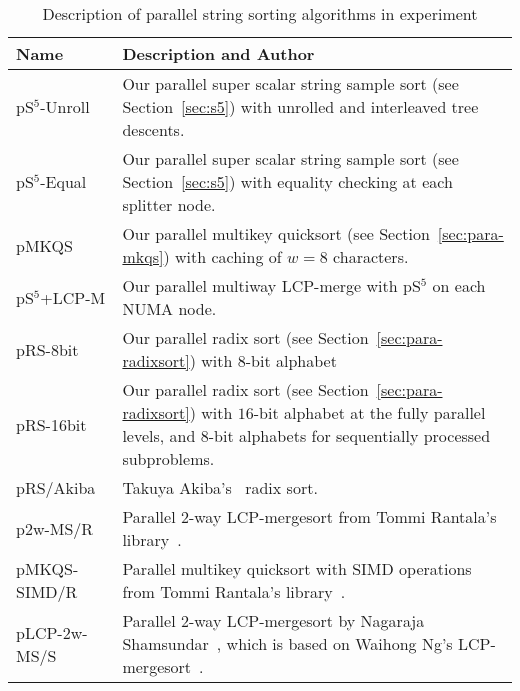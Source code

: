 \documentclass[a4paper]{myjournal}
\begin{document}
\begin{table}\centering\small
\caption{Description of parallel string sorting algorithms in experiment}\label{tab:paraalgo}
\begin{tabularx}{\linewidth}{l|X}
Name          & Description and Author                                                                                                                                                            \\ \hline
pS$^5$-Unroll & Our parallel super scalar string sample sort (see Section~\ref{sec:s5}) with unrolled and interleaved tree descents.                                                              \\
 pS$^5$-Equal & Our parallel super scalar string sample sort (see Section~\ref{sec:s5}) with equality checking at each splitter node.                                                             \\
        pMKQS & Our parallel multikey quicksort (see Section~\ref{sec:para-mkqs}) with caching of $w = 8$ characters.                                                                             \\
pS$^5$+LCP-M  & Our parallel multiway LCP-merge with pS$^5$ on each NUMA node.                                                                                                                \\
     pRS-8bit & Our parallel radix sort (see Section~\ref{sec:para-radixsort}) with $8$-bit alphabet                                                                                              \\
    pRS-16bit & Our parallel radix sort (see Section~\ref{sec:para-radixsort}) with $16$-bit alphabet at the fully parallel levels, and $8$-bit alphabets for sequentially processed subproblems. \\
    pRS/Akiba & Ta\-kuya Akiba's~\cite{akiba2011radixsort} radix sort.                                                                                                                            \\
     p2w-MS/R & Parallel 2-way LCP-mergesort from Tommi Rantala's  library~\cite{rantala2007web}.                                                                                                 \\
 pMKQS-SIMD/R & Parallel multikey quicksort with SIMD operations from Tommi Rantala's library~\cite{rantala2007web}.                                                                              \\
 pLCP-2w-MS/S & Parallel 2-way LCP-mergesort by Nagaraja Shamsundar~\cite{shamsundar2009lcpmergesort}, which is based on Waihong Ng's LCP-mergesort~\cite{ng2008merging}.                         \\ \hline
\end{tabularx}
\end{table}
 
\end{document}
